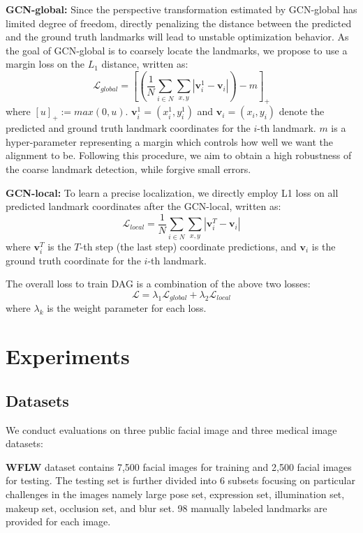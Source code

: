 \documentclass[runningheads]{llncs}
\begin{document}
\textbf{GCN-global:} Since the perspective transformation estimated by GCN-global has limited degree of freedom, directly penalizing the distance between the predicted and the ground truth landmarks will lead to unstable optimization behavior. As the goal of GCN-global is to coarsely locate the landmarks, we propose to use a margin loss on the $L_1$ distance, written as:
\begin{equation}
	\mathcal{L}_{global}= \left[\left(\frac{1}{N}\sum_{i\in N}\sum_{x,y}|\mathbf{v}_i^1-\mathbf{v}_i|\right)-m\right]_+
\end{equation}
where $[u]_+ := max(0, u)$. $\mathbf{v}_i^1=(x_i^1, y_i^1)$ and $\mathbf{v}_i=(x_i, y_i)$ denote the predicted and ground truth landmark coordinates for the $i$-th landmark. $m$ is a hyper-parameter representing a margin which controls how well we want the alignment to be. Following this procedure, we aim to obtain a high robustness of the coarse landmark detection, while forgive small errors.

\textbf{GCN-local:} To learn a precise localization, we directly employ L1 loss on all predicted landmark coordinates after the GCN-local, written as:
\begin{equation}
	\mathcal{L}_{local}= \frac{1}{N}\sum_{i\in N}\sum_{x,y}|\mathbf{v}_i^{T}-\mathbf{v}_i|
\end{equation}
where $\mathbf{v}_i^{T}$ is the $T$-th step (the last step) coordinate predictions, and $\mathbf{v}_i$ is the ground truth coordinate for the $i$-th landmark.

The overall loss to train DAG is a combination of the above two losses:
\begin{equation}
	\mathcal{L}= \lambda_1\mathcal{L}_{global} + \lambda_2\mathcal{L}_{local}
\end{equation}
where $\lambda_k$ is the weight parameter for each loss.

\section{Experiments}
\subsection{Datasets} 

We conduct evaluations on three public facial image and three medical image datasets:

\noindent\textbf{WFLW} \cite{wu2018look} dataset contains 7,500 facial images for training and 2,500 facial images for testing. The testing set is further divided into 6 subsets focusing on particular challenges in the images namely large pose set, expression set, illumination set, makeup set, occlusion set, and blur set. 98 manually labeled landmarks are provided for each image.
\end{document}
